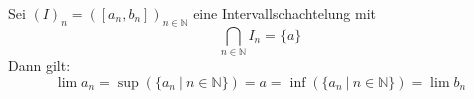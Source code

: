 Sei $(I)_n = ([a_n, b_n])_{n \in \mathbb{N}}$ eine Intervallschachtelung mit
$$\bigcap_{n \in \mathbb{N}} I_n = \{a\}$$
Dann gilt: 
$$\lim a_n = \sup(\{a_n \ | \ n \in \mathbb{N}\}) = a = \inf(\{a_n \ | \ n \in \mathbb{N}\}) = \lim b_n$$